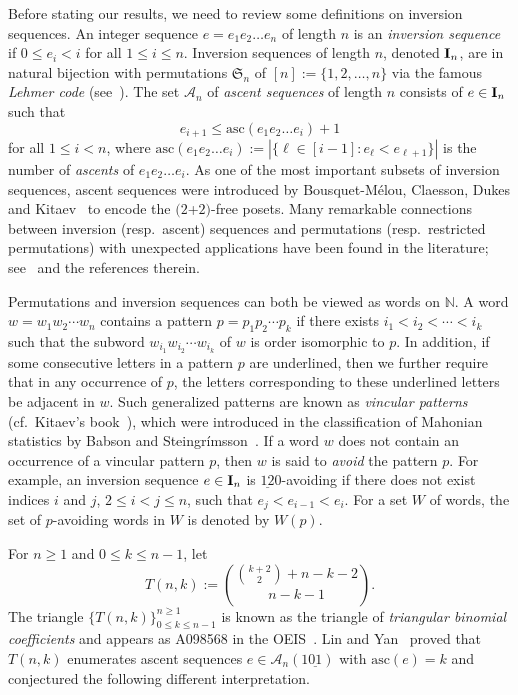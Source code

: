 \documentclass[12pt,A4]{amsart}
\numberwithin{equation}{section}
\theoremstyle{plain}
\theoremstyle{definition}
\newcommand{\N}{\mathbb{N}}
\def\S{\mathfrak{S}}
\def\A{\mathcal{A}}
\def\asc{\mathrm{asc}}
\def\I{\operatorname{{\bf I}}}
\begin{document}
Before stating our results, we need to review some definitions on inversion sequences. An integer sequence $e=e_1e_2\ldots e_n$ of length $n$ is an {\em inversion sequence} if $0\leq e_i<i$ for all $1\leq i\leq n$. Inversion sequences of length $n$, denoted $\I_n$, are in natural bijection with permutations $\S_n$ of $[n]:=\{1,2,\ldots,n\}$ via the famous {\em Lehmer code} (see~\cite{cor,kl}). The set $\A_n$ of {\em ascent sequences} of length $n$ consists of $e\in\I_n$ such that 
$$
e_{i+1}\leq \asc(e_1e_2\ldots e_{i})+1
$$
for all $1\leq i<n$, where $\asc(e_1e_2\ldots e_i):=|\{\ell\in[i-1]:e_{\ell}<e_{\ell+1}\}|$ is the number of {\em ascents} of $e_1e_2\ldots e_i$.
As one of the most important subsets of inversion sequences, ascent sequences were introduced by Bousquet-M\'elou, Claesson, Dukes and Kitaev~\cite{bcdk} to encode the $(2$+$2)$-free posets. Many remarkable connections between inversion (resp.~ascent) sequences and permutations (resp.~restricted permutations) with unexpected applications have been found in the literature; see~\cite{sav,kl,fjlyz} and the references therein. 

Permutations and inversion sequences can both be viewed as words on $\N$. A word $w=w_1w_2\cdots w_n$ contains  a pattern $p=p_1p_2\cdots p_k$ if there exists $i_1<i_2<\cdots<i_k$ such that the subword $w_{i_1}w_{i_2}\cdots w_{i_k}$ of $w$ is order isomorphic  to $p$. In addition, if some consecutive letters in a pattern $p$ are underlined, then we further require that in any occurrence of $p$, the letters corresponding to these underlined letters be adjacent in $w$. Such generalized patterns are known as {\em vincular patterns} (cf.~Kitaev's book~\cite[pp.2]{ki}), which were introduced in the classification of Mahonian statistics by Babson and Steingr\'imsson~\cite{bs}. If a word $w$ does not contain an occurrence of  a vincular pattern $p$, then $w$ is said to {\em avoid} the pattern $p$. For example, an inversion sequence $e\in\I_n$ is  $\underline{12}0$-avoiding if there does not exist indices $i$ and $j$, $2\leq i<j\leq n$, such that $e_j<e_{i-1}<e_i$.
For a set $W$ of words, the set of $p$-avoiding words in $W$ is denoted by $W(p)$. 


For $n\geq1$ and $0\leq k\leq n-1$, let 
$$
T(n,k):={{k+2\choose2}+n-k-2\choose n-k-1}.
$$
The triangle $\{T(n,k)\}_{0\leq k\leq n-1}^{n\geq1}$ is known as the triangle of {\em triangular binomial coefficients} and appears as A098568 in the OEIS~\cite{oeis}. Lin and Yan~\cite{ly} proved that $T(n,k)$ enumerates ascent sequences $e\in\A_n(1\underline{01})$ with $\asc(e)=k$ and 
 conjectured the following different interpretation.
\end{document}
